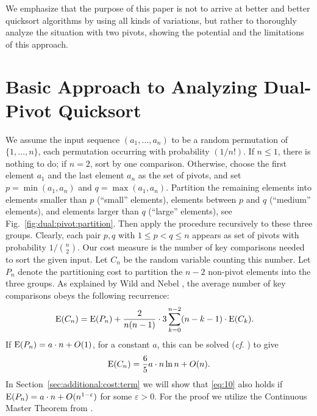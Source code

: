 \documentclass[prodmode,acmtalg]{acmsmall}
\newcommand{\E}{\textnormal{\textrm{E}}}
\begin{document}
We emphasize that the purpose of this paper is not to arrive at better and
better quicksort algorithms by using all kinds of variations, but rather to
thoroughly analyze the situation with two pivots, showing the potential and the
limitations of this approach.  

\section{Basic Approach to Analyzing Dual-Pivot
Quicksort}\label{sec:average:case:analysis}
We assume the input sequence $(a_1,\ldots,a_n)$ to be a random permutation of $\{1,\ldots,n\}$,
each permutation occurring with probability $(1/n!)$. If $n \leq 1$, there is
nothing to do; if $n = 2$, sort by one comparison. Otherwise, choose the first element $a_1$ and
the last element $a_n$ as the set of pivots, and set $p = \min(a_1,a_n)$
and $q = \max(a_1,a_n)$. Partition the remaining elements into elements smaller
than $p$
(``small'' elements), 
elements between $p$ and $q$ (``medium'' elements), and elements larger than $q$
(``large'' elements), see Fig.~\ref{fig:dual:pivot:partition}.
Then apply the procedure recursively to these three 
groups.
Clearly, each pair $p,q$ with $1 \leq p < q \leq n$
appears as set of pivots with probability $1/\binom{n}{2}$.
Our cost measure is the number of key comparisons needed to
sort the given input. Let
$C_n$ be the random variable counting this number. Let $P_n$ denote the
partitioning cost to partition the $n-2$ non-pivot elements into the three
groups. As
explained by Wild and Nebel \cite[Appendix A]{nebel12}, the average number of
key comparisons obeys the following recurrence: 
\begin{align}\label{eq:25}
    \E(C_n) &= 
\E(P_n) + \frac{2}{n(n-1)} \cdot 3 \sum_{k = 0}^{n-2}
    (n-k-1)\cdot \E(C_k).
\end{align}
If $\E(P_n) = a \cdot n + O(1)$, for a constant $a$, this can
be solved (\emph{cf.} \cite{hennequin,nebel12}) to give
\begin{equation}\label{eq:10}
    \E(C_n) = \frac{6}{5}a \cdot n \ln n + O(n).
\end{equation}
In Section~\ref{sec:additional:cost:term} we will show that \eqref{eq:10} also holds
if $\E(P_n) = a \cdot n + O(n^{1-\varepsilon})$ for some $\varepsilon > 0$. 
For the proof we utilize the Continuous Master Theorem from \cite{Roura01}.
\end{document}
